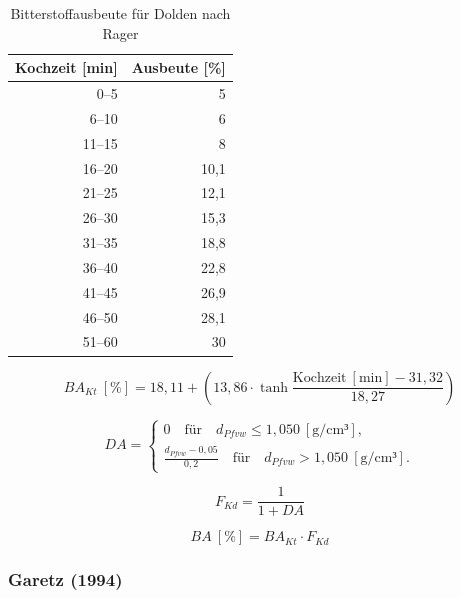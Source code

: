 \documentclass[a4paper,parskip=half]{scrartcl}
\newcommand{\BA}{\mathit{BA}}
\newcommand{\BAKt}{{\mathit{BA}}_{\mathit{Kt}}}
\newcommand{\umin}{\:[\textrm{min}]}
\newcommand{\uden}{\:[\text{g/cm³}]}
\newcommand{\uper}{\:[\text{\%}]}
\newcommand{\FKd}{F_{\mathit{Kd}}}
\begin{document}
\begin{table}[H]
\centering
\begin{tabular}{rr}
\toprule
\multicolumn{1}{c}{\textbf{Kochzeit [min]}} & \multicolumn{1}{c}{\textbf{Ausbeute [\%]}} \\
\midrule
0–5             & 5 \\
6–10            & 6 \\
11–15           & 8 \\
16–20           & 10,1 \\
21–25           & 12,1 \\
26–30           & 15,3 \\
31–35           & 18,8 \\
36–40           & 22,8 \\
41–45           & 26,9 \\
46–50           & 28,1 \\
51–60           & 30 \\
\bottomrule
\end{tabular}
\caption{Bitterstoffausbeute für Dolden nach Rager \parencite[54]{Rager1990}}
\label{table:ragerbakt}
\end{table}

\begin{equation}
\BAKt \uper = 18,11 + \left(13,86 \cdot \tanh{\frac{\text{Kochzeit} \umin - 31,32}{18,27}}\right)
\label{eq:ragerbakt}
\end{equation}


\begin{equation}
\mathit{DA} = \begin{cases}
0 \quad \text{für} \quad d_{\mathit{Pfvw}} \le 1,050 \uden, \\
\frac{d_{\mathit{Pfvw}} - 0,05}{0,2} \quad \text{für} \quad d_{\mathit{Pfvw}} > 1,050 \uden.
\end{cases}
\label{eq:ragerga}
\end{equation}

\begin{equation}
\FKd = \frac{1}{1 + \mathit{DA}}
\label{eq:ragerfkd}
\end{equation}


\begin{equation}
\BA \uper = \BAKt \cdot \FKd
\label{eq:ragerba}
\end{equation}

\subsubsection*{Garetz (1994)}
\end{document}
